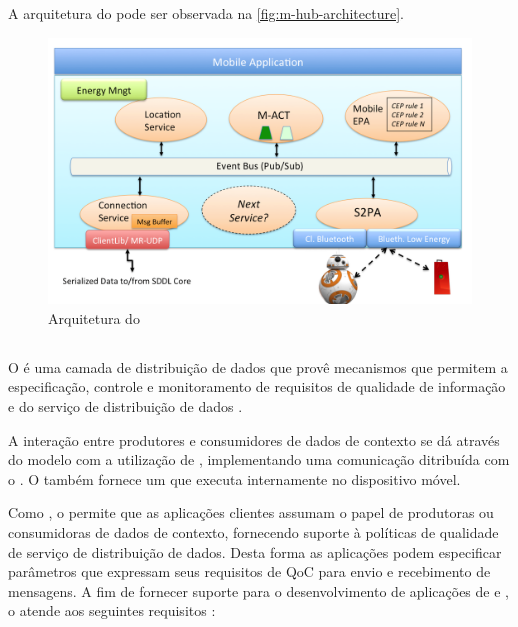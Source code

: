 A arquitetura do \middleware pode ser observada na \autoref{fig:m-hub-architecture}.

\begin{figure}[htb]
	\centering
	\caption{\label{fig:m-hub-architecture}Arquitetura do \mhub}
	\includegraphics[scale=0.34]{img/m-hub-architecture.png}
\end{figure}

\subsection{\cddl} \label{subsec:cddl}

O \cddl é uma camada de distribuição de dados que provê mecanismos que permitem a especificação, controle e monitoramento de requisitos de qualidade de informação e do serviço de distribuição de dados \cite{gomes:2017}.

A interação entre produtores e consumidores de dados de contexto se dá através do modelo \pubsub com a utilização de \brokers, implementando uma comunicação ditribuída com o \mqtt. O \cddl também fornece um \ubroker que executa internamente no dispositivo móvel.

Como \middleware, o \cddl permite que as aplicações clientes assumam o papel de produtoras ou consumidoras de dados de contexto, fornecendo suporte à políticas de qualidade de serviço de distribuição de dados. Desta forma as aplicações podem especificar parâmetros que expressam seus requisitos de QoC para envio e recebimento de mensagens. A fim de fornecer suporte para o desenvolvimento de aplicações de \iot e \iomt, o \cddl atende aos seguintes requisitos \cite{muniz:2017}:

